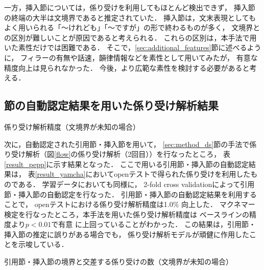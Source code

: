 \documentclass[japanese]{jnlp_1.4}
\begin{document}
一方，挿入節については，係り受けを利用してもほとんど検出できず，
挿入節の終端の大半は文境界であると推定されていた．
挿入節は，文末表現としてもよく用いられる「〜けれども」「〜ですが」の形で終わるものが多く，
文境界との区別が難しいことが原因であると考えられる．
これらの区別は，本手法で用いた素性だけでは困難である．
そこで，\ref{sec:additional_features}節に述べるように，
フィラーの有無や話速，韻律情報などを素性として用いてみたが，
有意な精度向上は見られなかった．
今後，より広範な素性を検討する必要があると考える．


\subsection{節の自動認定結果を用いた係り受け解析結果}\label{sec:eval_db}

\begin{table}[b]
\caption{係り受け解析精度（文境界が未知の場合）}
\label{result_pepp}
\begin{center}

\end{center}
\end{table}

次に，自動認定された引用節・挿入節を用いて，
\ref{sec:method_ds}節の手法で係り受け解析（図\ref{flow}の係り受け解析（2回目））を行なったところ，
表\ref{result_pepp}に示す結果となった．
ここで用いる引用節・挿入節の自動認定結果は，
表\ref{result_yamcha}においてopenテストで得られた係り受けを利用したものである．
学習データにおいても同様に，
2-fold cross validationによって引用節・挿入節の自動認定を行なった．
引用節・挿入節の自動認定結果を利用することで，
openテストにおける係り受け解析精度は1.0\% 向上した．
マクネマー検定を行なったところ，本手法を用いた係り受け解析精度は
ベースラインの精度より$p<0.01$で有意
に上回っていることがわかった．
この結果は，引用節・挿入節の推定に誤りがある場合でも，
係り受け解析モデルが頑健に作用したことを示唆している．

\begin{table}[t]
\caption{引用節・挿入節の境界と交差する係り受けの数（文境界が未知の場合）}
\label{result_cross}
\begin{center}

\end{center}
\end{table}
\end{document}
